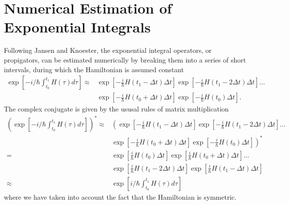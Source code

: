 \documentclass{article}
\begin{document}
\section{Numerical Estimation of Exponential Integrals}
Following Jansen and Knoester,\cite{Jansen2006} the exponential integral operators, or propigators, can be estimated numerically by breaking them into a series of short intervals, during which the Hamiltonian is assumed constant
\begin{equation}
\begin{split}
\exp\left[-i/\hbar\int_{t_{0}}^{t_{1}}H(\tau)d\tau\right]\approx&
\exp\left[-\frac{i}{\hbar}H(t_{1}-\Delta t)\Delta t\right]
\exp\left[-\frac{i}{\hbar}H(t_{1}-2\Delta t)\Delta t\right]
\ldots\\
&\exp\left[-\frac{i}{\hbar}H(t_{0}+\Delta t)\Delta t\right]
\exp\left[-\frac{i}{\hbar}H(t_{0})\Delta t\right].
\end{split}
\end{equation}
The complex conjugate is given by the ususal rules of matrix multiplication
\begin{equation}
\begin{split}
\left(\exp\left[-i/\hbar\int_{t_{0}}^{t_{1}}H(\tau)d\tau\right]\right)^{*}\approx&
\left(\exp\left[-\frac{i}{\hbar}H(t_{1}-\Delta t)\Delta t\right]
\exp\left[-\frac{i}{\hbar}H(t_{1}-2\Delta t)\Delta t\right]
\ldots\right.\\
&\left.\exp\left[-\frac{i}{\hbar}H(t_{0}+\Delta t)\Delta t\right]
\exp\left[-\frac{i}{\hbar}H(t_{0})\Delta t\right]\right)^{*}\\
=&\exp\left[\frac{i}{\hbar}H(t_{0})\Delta t\right]
\exp\left[\frac{i}{\hbar}H(t_{0}+\Delta t)\Delta t\right]
\ldots\\
&
\exp\left[\frac{i}{\hbar}H(t_{1}-2\Delta t)\Delta t\right]
\exp\left[\frac{i}{\hbar}H(t_{1}-\Delta t)\Delta t\right]\\
\approx&
\exp\left[i/\hbar\int_{t_{0}}^{t_{1}}H(\tau)d\tau\right]
\end{split}
\end{equation}
where we have taken into account the fact that the Hamiltonian is symmetric.


\clearpage


\end{document}
